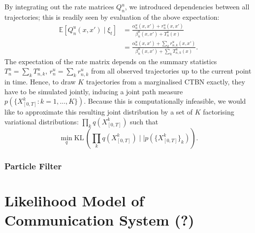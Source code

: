 \bigskip
By integrating out the rate matrices $Q^u_n$, we introduced dependencies between all trajectories; this is readily seen by evaluation of the above expectation:
\begin{align}
\mathbb{E}[Q^u_n (x, x') \mid \xi_t] &=\frac{\alpha^u_n(x, x') + r^u_n(x, x')}{\beta^u_n(x, x') + T^u_n(x)}\\
&=\frac{\alpha^u_n(x, x') + \sum_k r^u_{n, k}(x, x')}{\beta^u_n(x, x') + \sum_k T^u_{n, k}(x)}.
\end{align}
The expectation of the rate matrix depends on the summary statistics $T^u_n = \sum_k T^u_{n,k}$, $r^u_n = \sum_k r^u_{n,k}$ from all observed trajectories up to the current point in time. Hence, to draw $K$ trajectories from a marginalised CTBN exactly, they have to be simulated jointly, inducing a joint path measure $p(\{X^k_{[0, T]} : k = 1, ..., K\})$.
Because this is computationally infeasible, we would like to approximate this resulting joint distribution
by a set of $K$ factorising variational distributions: $\prod_k q(X^k_{[0, T]})$ such that
\begin{equation}
\min_q \mathrm{KL}\,\left(\prod_k q(X^k_{[0, T]})\mid\mid p(\{X^k_{[0, T]}\}_k)\right).
\end{equation}


\subsubsection{Particle Filter}


\section{Likelihood Model of Communication System (?)}